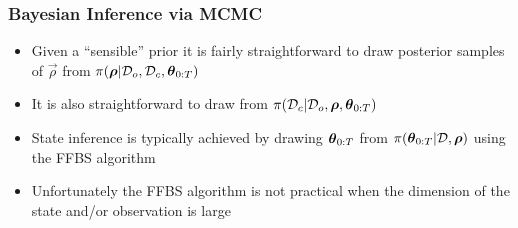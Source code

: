 \begin{frame}
\frametitle{Bayesian Inference via MCMC}
\bigskip
\begin{itemize}
\item Given a ``sensible'' prior it is fairly straightforward to draw posterior samples of $\vec{\rho}$ from $\pi(\boldsymbol{\rho}|\mathcal{D}_o,\mathcal{D}_c,\boldsymbol{\theta}_{0:T})$
\bigskip
\item It is also straightforward to draw from $\pi(\mathcal{D}_c|\mathcal{D}_o,\boldsymbol{\rho},\boldsymbol{\theta}_{0:T})$
\bigskip
\item State inference is typically achieved by drawing $\boldsymbol{\theta}_{0:T}$ from $\pi(\boldsymbol{\theta}_{0:T}|\mathcal{D}, \boldsymbol{\rho})$ using the FFBS algorithm
\bigskip
\item Unfortunately the FFBS algorithm is not practical when the dimension of the state and/or observation is large
\end{itemize}
\end{frame}



